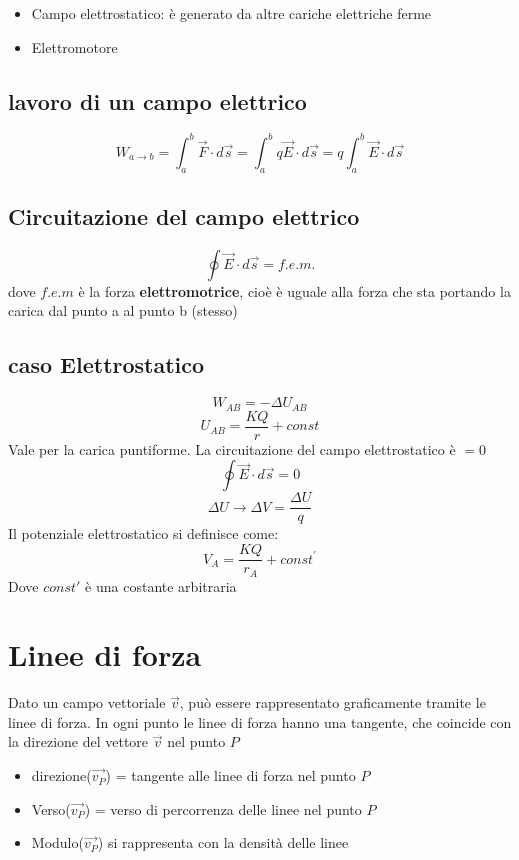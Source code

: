 \documentclass[a4paper]{report}
\begin{document}
  \begin{itemize}
    \item Campo elettrostatico: è generato da altre cariche elettriche ferme
    \item Elettromotore
  \end{itemize}

  \subsection{lavoro di un campo elettrico}
  \[ W_{a \rightarrow b} = \int_a^b \vec{F}\cdot d\vec{s} = \int_a^b q \vec{E} \cdot d\vec{s} = q \int_a^b \vec{E}\cdot d\vec{s} \]

  \subsection{Circuitazione del campo elettrico}
  \[\oint \vec{E} \cdot d\vec{s} = f.e.m.\]
  dove $f.e.m$ è la forza \textbf{elettromotrice}, cioè è uguale alla forza che sta portando la carica dal punto a al punto b (stesso)

  \subsection{caso Elettrostatico}
  \[ W_{AB} = - \Delta U_{AB}\]
  \[ U_{AB} = \frac{KQ}{r} + const \]
  Vale per la carica puntiforme. La circuitazione del campo elettrostatico è $=0$
  \[ \oint \vec{E} \cdot d\vec{s} = 0 \]
  \[ \Delta U \longrightarrow \Delta V = \frac{\Delta U}{q} \]
  Il potenziale elettrostatico si definisce come:
  \[ V_A = \frac{KQ}{r_A} + const^{'}\]
  Dove $const'$ è una costante arbitraria

  \section{Linee di forza}
  Dato un campo vettoriale $\vec{v}$, può essere rappresentato graficamente tramite le linee di forza. In ogni punto le linee di forza hanno una tangente, che coincide con la direzione del vettore $\vec{v}$ nel punto $P$
  \begin{itemize}
    \item direzione($\vec{v_P}$) = tangente alle linee di forza nel punto $P$
    \item Verso($\vec{v_P}$) = verso di percorrenza delle linee nel punto $P$
    \item Modulo($\vec{v_P}$) si rappresenta con la densità delle linee
  \end{itemize}
\end{document}
